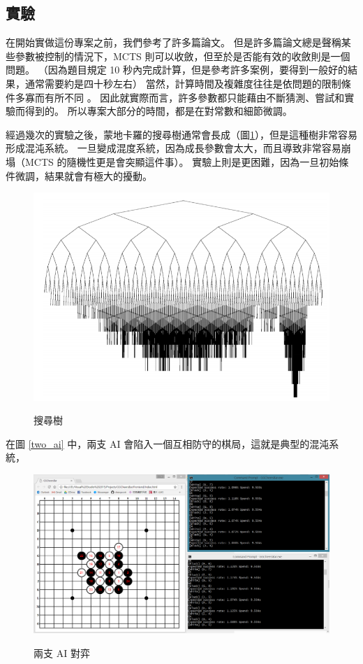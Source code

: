\documentclass[12pt]{article}
\begin{document}
\begin{CJK}{UTF8}{bsmi}
\section{實驗}
在開始實做這份專案之前，我們參考了許多篇論文。
但是許多篇論文總是聲稱某些參數被控制的情況下，MCTS 則可以收斂，但至於是否能有效的收斂則是一個問題。
（因為題目規定 10 秒內完成計算，但是參考許多案例，要得到一般好的結果，通常需要約是四十秒左右）
當然，計算時間及複雜度往往是依問題的限制條件多寡而有所不同 \cite{SVMCTS}。
因此就實際而言，許多參數都只能藉由不斷猜測、嘗試和實驗而得到的。
所以專案大部分的時間，都是在對常數和細節微調。

經過幾次的實驗之後，蒙地卡羅的搜尋樹通常會長成（圖\ref{search}），但是這種樹非常容易形成混沌系統\cite{CHAOS}。
一旦變成混度系統，因為成長參數會太大，而且導致非常容易崩塌（MCTS 的隨機性更是會突顯這件事）。
實驗上則是更困難，因為一旦初始條件微調，結果就會有極大的擾動。
\begin{figure}[h]
  \caption{搜尋樹}
  \centering
  \includegraphics[width=.5\textwidth]{search}
  \label{search}
\end{figure}

在圖 \ref{two_ai} 中，兩支 AI 會陷入一個互相防守的棋局，這就是典型的混沌系統，
\begin{figure}[h]
  \caption{兩支 AI 對弈}
  \centering
  \includegraphics[width=1\textwidth]{chaos}
  \label{chaos}
\end{figure}


\end{CJK}
\end{document}
